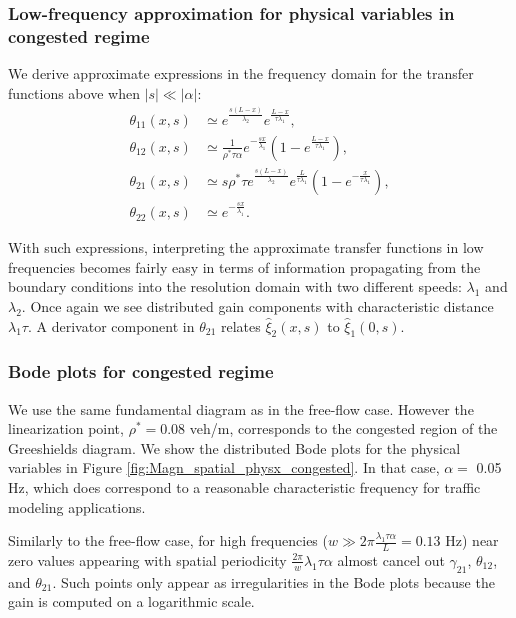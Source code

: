 \documentclass[letterpaper, 10 pt, conference]{ieeeconf}  %
\begin{document}
\subsubsection{Low-frequency approximation for physical variables in congested regime}
We derive approximate expressions in the frequency domain for the transfer functions above when $\left|s\right|\ll\left|\alpha\right|$:
\begin{subequations}
\begin{align}
\theta_{11}\left(x,s\right) &\simeq
e^{\frac{s\left(L-x\right)}{\lambda_{2}}}
e^{\frac{L-x}{\tau\lambda_{1}}},\\
\theta_{12}\left(x,s\right) &\simeq
\frac{1}{\rho^{*}\tau\alpha}
e^{-\frac{sx}{\lambda_{1}}}
\left(
	1 - e^{\frac{L-x}{\tau\lambda_{1}}}
\right),\\
\theta_{21}\left(x,s\right) &\simeq
s \rho^{*}\tau
e^{\frac{s\left(L-x\right)}{\lambda_{2}}}
e^{\frac{L}{\tau\lambda_{1}}}
\left(
	1 - e^{-\frac{x}{\tau\lambda_{1}}}
\right),\\
\theta_{22}\left(x,s\right) &\simeq
e^{-\frac{sx}{\lambda_{1}}}.
\end{align}
\end{subequations}

With such expressions, interpreting the approximate transfer functions in low frequencies becomes fairly easy in terms of information propagating from the boundary conditions into the resolution domain with two different speeds: $\lambda_1$ and $\lambda_2$. Once again we see distributed gain components with characteristic distance $\lambda_1 \tau$. A derivator component in $\theta_{21}$ relates $\hat{\xi}_2(x,s)$ to $\hat{\xi}_1(0,s)$.

\subsubsection{Bode plots for congested regime}
We use the same fundamental diagram as in the free-flow case. However the linearization point, $\rho^* = 0.08$ veh/m, corresponds to the congested region of the Greeshields diagram. We show the distributed Bode plots for the physical variables in Figure \ref{fig:Magn_spatial_physx_congested}. In that case, $\alpha =$ 0.05 Hz, which does correspond to a reasonable characteristic frequency for traffic modeling applications.

Similarly to the free-flow case, for high frequencies ($w \gg 2 \pi \frac{\lambda_{1} \tau \alpha}{L} = 0.13$ Hz) near zero values appearing with spatial periodicity $\frac{2 \pi}{w} \lambda_{1} \tau \alpha$ almost cancel out $\gamma_{21}$, $\theta_{12}$, and $\theta_{21}$. Such points only appear as irregularities in the Bode plots because the gain is computed on a logarithmic scale.\\
\end{document}
